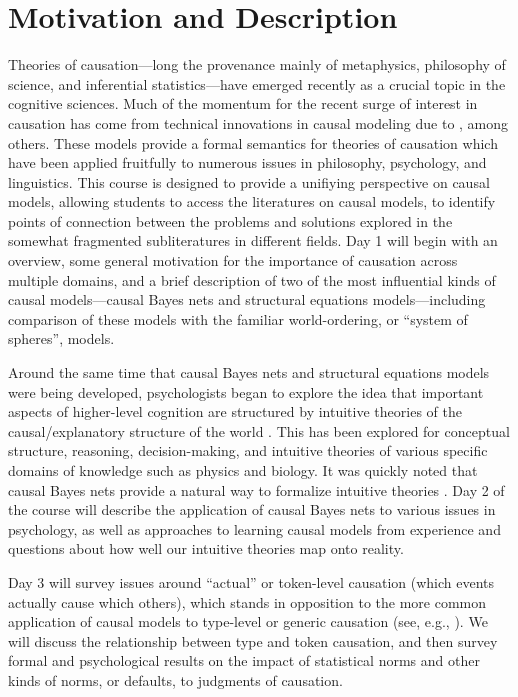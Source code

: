 \documentclass[english]{article}
\begin{document}
\section*{\large{Motivation and Description}}

Theories of causation---long the provenance mainly of metaphysics, philosophy of science, and inferential statistics---have emerged recently as a crucial topic in the cognitive sciences. Much of the momentum for the recent surge of interest in causation has come from technical innovations in causal modeling due to \citet{spirtes93,pearl00}, among others. These models provide a formal semantics for theories of causation which have been applied fruitfully to numerous issues in philosophy, psychology, and linguistics. This course is designed to provide a unifiying perspective on causal models, allowing students to access the literatures on causal models, to identify points of connection between the problems and solutions explored in the somewhat fragmented subliteratures in different fields. Day 1 will begin with an overview, some general motivation for the importance of causation across multiple domains, and a brief description of two of the most influential kinds of causal models---causal Bayes nets and structural equations models---including comparison of these models with the familiar world-ordering, or ``system of spheres'', models.

Around the same time that causal Bayes nets and structural equations models were being developed, psychologists began to explore the idea that important aspects of higher-level cognition are structured by intuitive theories of the causal/explanatory structure of the world \citep{keil89,gopnikmeltzoff97}. This has been explored for conceptual structure, reasoning, decision-making, and intuitive theories of various specific domains of knowledge such as physics and biology. It was quickly noted that causal Bayes nets provide a natural way to formalize intuitive theories \citep{glymour01,gopnik04,gopnikschultz07}. Day 2 of the course will describe the application of causal Bayes nets to various issues in psychology, as well as approaches to learning causal models from experience and questions about how well our intuitive theories map onto reality.

Day 3 will survey issues around ``actual'' or token-level causation (which events actually cause which others), which stands in opposition to the more common application of causal models to type-level or generic causation (see, e.g., \citealt{halpernpearl05a,halpernpearl05b}). We will discuss the relationship between type and token causation, and then survey formal and psychological results on the impact of statistical norms and other kinds of norms, or defaults, to judgments of causation.
\end{document}
